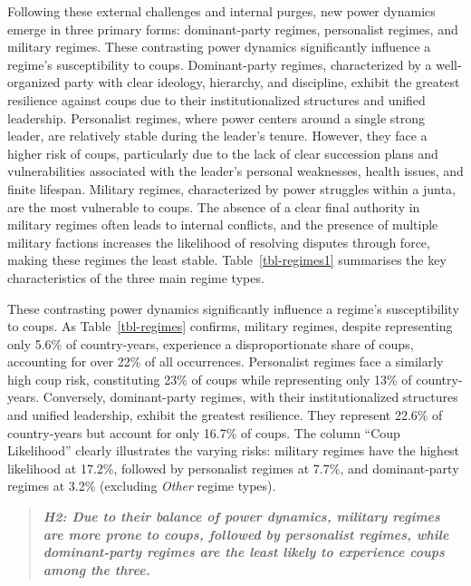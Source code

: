 \documentclass[
  12pt,
]{report}
\begin{document}
Following these external challenges and internal purges, new power
dynamics emerge in three primary forms: dominant-party regimes,
personalist regimes, and military regimes. These contrasting power
dynamics significantly influence a regime's susceptibility to coups.
Dominant-party regimes, characterized by a well-organized party with
clear ideology, hierarchy, and discipline, exhibit the greatest
resilience against coups due to their institutionalized structures and
unified leadership. Personalist regimes, where power centers around a
single strong leader, are relatively stable during the leader's tenure.
However, they face a higher risk of coups, particularly due to the lack
of clear succession plans and vulnerabilities associated with the
leader's personal weaknesses, health issues, and finite lifespan.
Military regimes, characterized by power struggles within a junta, are
the most vulnerable to coups. The absence of a clear final authority in
military regimes often leads to internal conflicts, and the presence of
multiple military factions increases the likelihood of resolving
disputes through force, making these regimes the least stable.
Table~\ref{tbl-regimes1} summarises the key characteristics of the three
main regime types.

These contrasting power dynamics significantly influence a regime's
susceptibility to coups. As Table~\ref{tbl-regimes} confirms, military
regimes, despite representing only 5.6\% of country-years, experience a
disproportionate share of coups, accounting for over 22\% of all
occurrences. Personalist regimes face a similarly high coup risk,
constituting 23\% of coups while representing only 13\% of
country-years. Conversely, dominant-party regimes, with their
institutionalized structures and unified leadership, exhibit the
greatest resilience. They represent 22.6\% of country-years but account
for only 16.7\% of coups. The column ``Coup Likelihood'' clearly
illustrates the varying risks: military regimes have the highest
likelihood at 17.2\%, followed by personalist regimes at 7.7\%, and
dominant-party regimes at 3.2\% (excluding \emph{Other} regime types).

\begin{quote}
\textbf{\emph{H2: Due to their balance of power dynamics, military
regimes are more prone to coups, followed by personalist regimes, while
dominant-party regimes are the least likely to experience coups among
the three.}}
\end{quote}

\newpage
\end{document}

